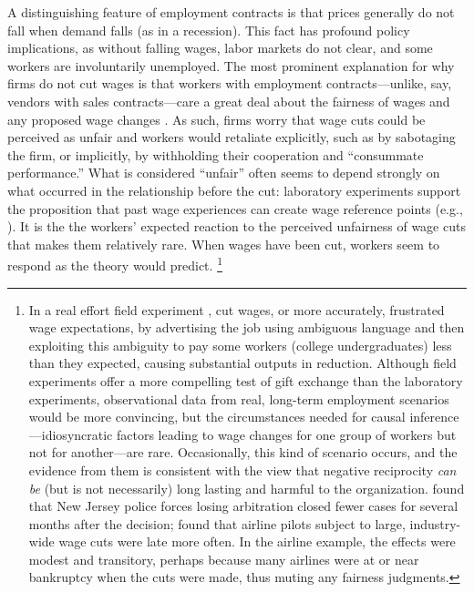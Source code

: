 \documentclass[11pt]{article}
\begin{document}
A distinguishing feature of employment contracts is that prices generally do not fall when demand falls (as in a recession). 
This fact has profound policy implications, as without falling wages, labor markets do not clear, and some workers are involuntarily unemployed.
The most prominent explanation for why firms do not cut wages is that workers with employment contracts---unlike, say, vendors with sales contracts---care a great deal about the fairness of wages and any proposed wage changes \citep{bewley1999wwd}. 
As such, firms worry that wage cuts could be perceived as unfair and workers would retaliate explicitly, such as by sabotaging the firm, or implicitly, by withholding their cooperation and ``consummate performance.''
What is considered ``unfair'' often seems to depend strongly on what occurred in the relationship before the cut: 
laboratory experiments support the proposition that past wage experiences can create wage reference points (e.g., \cite{fehr2006fpr}).
It is the the workers' expected reaction to the perceived unfairness of wage cuts that makes them relatively rare.
When wages have been cut, workers seem to respond as the theory would predict.
\footnote{
In a real effort field experiment \cite{kube2007wcd}, cut wages, or more accurately, frustrated wage expectations, by advertising the job using ambiguous language and then exploiting this ambiguity to pay some workers (college undergraduates) less than they expected, causing substantial outputs in reduction.
Although field experiments offer a more compelling test of gift exchange than the laboratory experiments, observational data from real, long-term employment scenarios would be more convincing, but the circumstances needed for causal inference---idiosyncratic factors leading to wage changes for one group of workers but not for another---are rare. 
Occasionally, this kind of scenario occurs, and the evidence from them is consistent with the view that negative reciprocity \emph{can be} (but is not necessarily) long lasting and harmful to the organization. 
\cite{mas2006prp} found that New Jersey police forces losing arbitration closed fewer cases for several months after the decision; \cite{lee2007} found that airline pilots subject to large, industry-wide wage cuts were late more often. 
In the airline example, the effects were modest and transitory, perhaps because many airlines were at or near bankruptcy when the cuts were made, thus muting any fairness judgments.
}
\end{document}
